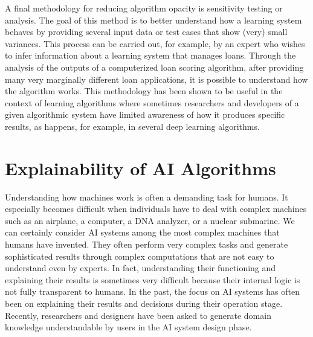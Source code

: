 A final methodology for reducing algorithm opacity is sensitivity testing or analysis. The goal of this method is to better understand how a learning system behaves by providing several input data or test cases that show (very) small variances. This process can be carried out, for example, by an expert who wishes to infer information about a learning system that manages loans. Through the analysis of the outputs of a computerized loan scoring algorithm, after providing many very marginally different loan applications, it is possible to understand how the algorithm works. This methodology has been shown to be useful in the context of learning algorithms where sometimes researchers and developers of a given algorithmic system have limited awareness of how it produces specific results, as happens, for example, in several deep learning algorithms.

\section{\label{sec:10.3}Explainability of AI Algorithms}

Understanding how machines work is often a demanding task for humans. It especially becomes difficult when individuals have to deal with complex machines such as an airplane, a computer, a DNA analyzer, or a nuclear submarine. We can certainly consider AI systems among the most complex machines that humans have invented. They often perform very complex tasks and generate sophisticated results through complex computations that are not easy to understand even by experts. In fact, understanding their functioning and explaining their results is sometimes very difficult because their internal logic is not fully transparent to humans. In the past, the focus on AI systems has often been on explaining their results and decisions during their operation stage. Recently, researchers and designers have been asked to generate domain knowledge understandable by users in the AI system design phase.


